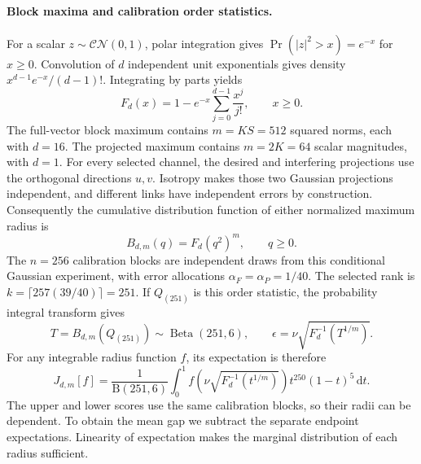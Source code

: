 \paragraph{Block maxima and calibration order statistics.}
For a scalar \(z\sim\mathcal{CN}(0,1)\), polar integration gives
\(\Pr(|z|^2>x)=e^{-x}\) for \(x\geq0\). Convolution of \(d\) independent unit exponentials gives density \(x^{d-1}e^{-x}/(d-1)!\). Integrating by parts yields
\begin{equation}
 F_d(x)=1-e^{-x}\sum_{j=0}^{d-1}\frac{x^j}{j!},\qquad x\geq0.
 \label{supp:eq:erlang}
\end{equation}
The full-vector block maximum contains \(m=KS=512\) squared norms, each with \(d=16\). The projected maximum contains \(m=2K=64\) scalar magnitudes, with \(d=1\). For every selected channel, the desired and interfering projections use the orthogonal directions \(u,v\). Isotropy makes those two Gaussian projections independent, and different links have independent errors by construction. Consequently the cumulative distribution function of either normalized maximum radius is
\begin{equation}
 B_{d,m}(q)=F_d(q^2)^m,\qquad q\geq0.
 \label{supp:eq:blockcdf}
\end{equation}
The \(n=256\) calibration blocks are independent draws from this conditional Gaussian experiment, with error allocations \(\alpha_F=\alpha_P=1/40\). The selected rank is \(k=\lceil257(39/40)\rceil=251\). If \(Q_{(251)}\) is this order statistic, the probability integral transform gives
\begin{equation}
 T=B_{d,m}(Q_{(251)})\sim\operatorname{Beta}(251,6),\qquad
 \epsilon=\nu\sqrt{F_d^{-1}(T^{1/m})}.
 \label{supp:eq:betaradius}
\end{equation}
For any integrable radius function \(f\), its expectation is therefore
\begin{equation}
 J_{d,m}[f]=
 \frac{1}{\mathrm B(251,6)}
 \int_0^1
 f\!\left(\nu\sqrt{F_d^{-1}(t^{1/m})}\right)
 t^{250}(1-t)^5\,\mathrm dt.
 \label{supp:eq:gaussintegral}
\end{equation}
The upper and lower scores use the same calibration blocks, so their radii can be dependent. To obtain the mean gap we subtract the separate endpoint expectations. Linearity of expectation makes the marginal distribution of each radius sufficient.

